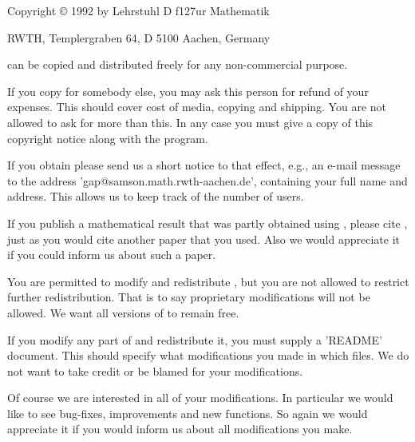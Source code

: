 \thispagestyle{empty}

{\large Copyright {\copyright} 1992 by Lehrstuhl D f{\accent127u}r Mathematik}

RWTH, Templergraben 64, D 5100 Aachen, Germany

{\GAP}  can  be  copied  and  distributed  freely for any  non-commercial
purpose.

If you copy {\GAP} for somebody else, you may ask this person for  refund
of your expenses.  This should cover cost of media, copying and shipping.
You are not allowed to ask for more than this.  In any case you must give
a copy of this copyright notice along with the program.

If you obtain {\GAP} please send us  a short notice to that effect, e.g.,
an  e-mail  message   to  the  address  'gap@samson.math.rwth-aachen.de',
containing your full  name and address.  This  allows us to keep track of
the number of {\GAP} users.

If you  publish  a mathematical result  that  was  partly obtained  using
{\GAP}, please cite {\GAP}, just as you would cite another paper that you
used.   Also we  would appreciate it if you could inform us about  such a
paper.

You  are permitted  to modify and  redistribute  {\GAP},  but you are not
allowed  to restrict further redistribution.  That is to say  proprietary
modifications will  not  be allowed.  We want all  versions  of {\GAP} to
remain free.

If you  modify any part of {\GAP} and redistribute it,  you must supply a
'README'  document.   This should specify what modifications you made  in
which  files.  We do  not  want  to take  credit  or  be blamed  for your
modifications.

Of course we are interested in all of your modifications.  In  particular
we would like to see bug-fixes, improvements and new functions.  So again
we would appreciate it if you would inform us about all modifications you
make.

